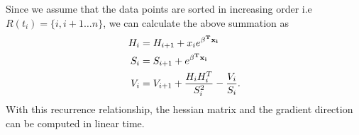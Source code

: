 \documentclass[12pt]{article}
\begin{document}
Since we assume that the data points are sorted in increasing order i.e $R(t_i) = \{i, i+1 \ldots n \}$, we can calculate the above summation as 
\begin{align}
H_{i}& =   H_{i+1} +  x_{i} e^{\bold{\beta^T x_i}}\\
S_i & = S_{i+1} + e^{\bold{\beta^T x_i}} \\
V_i & = V_{i+1} +  \frac{H_{i}H_{i}^T }{ S_{i}^2 } -  \frac{V_{i}}{ S_{i}}.
\end{align}
With this recurrence relationship, the hessian matrix and the gradient direction can be computed in linear time.






\end{document}
